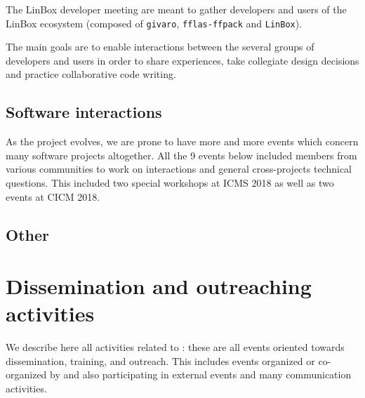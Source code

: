 \documentclass{deliverablereport}
\begin{document}
The LinBox developer meeting are meant to gather developers and users of the
LinBox ecosystem (composed of \texttt{givaro}, \texttt{fflas-ffpack} and
\texttt{LinBox}).

The main goals are to enable interactions between the several groups of
developers and users in order to share experiences, take collegiate design
decisions and practice collaborative code writing.





\subsection{Software interactions}

As the project evolves, we are prone to have more and more events which 
concern many software projects altogether. All the 9 events below
included members from various communities to work on interactions and
general cross-projects technical questions. This included two special
workshops at ICMS 2018 as well as two events at CICM 2018.



















\subsection{Other}



\section{Dissemination and outreaching activities}

We describe here all activities related to :
these are all events oriented towards dissemination, training, and outreach. This
includes events organized or co-organized by \ODK and also
participating in external events and many communication activities.
\end{document}
